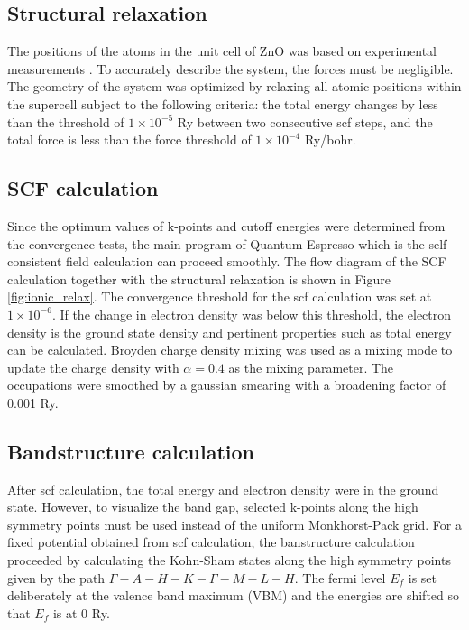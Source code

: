     \subsection{Structural relaxation}
    The positions of the atoms in the unit cell of ZnO was based on experimental measurements \citep{Sabine1969}.  To accurately describe the system, the forces must be negligible. The geometry of the system was optimized by relaxing all atomic positions within the supercell subject to the following criteria: the total energy changes by less than the threshold of $1 \times 10^{-5}$ Ry between two consecutive scf steps, and the total force is less than the force threshold of $1 \times 10^{-4}$ Ry/bohr. 

    \subsection{SCF calculation}
        Since the optimum values of k-points and cutoff energies were determined from the convergence tests, the main program of Quantum Espresso which is the self-consistent field calculation can proceed smoothly. The flow diagram of the SCF calculation together with the structural relaxation is shown in Figure \ref{fig:ionic_relax}. The convergence threshold for the scf calculation was set at $1 \times 10^{-6}$. If the change in electron density was below this threshold, the electron density is the ground state density and pertinent properties such as total energy can be calculated. Broyden charge density mixing was used as a mixing mode to update the charge density with  $\alpha = 0.4$ as the mixing parameter.   The occupations were smoothed by a gaussian smearing with a broadening factor of 0.001 Ry. 

        \subsection{Bandstructure calculation}
        After scf calculation, the total energy and electron density were in the ground state. However, to visualize the band gap, selected k-points along the high symmetry points must be used instead of the uniform Monkhorst-Pack grid. For a fixed potential obtained from scf calculation, the banstructure calculation proceeded by calculating the Kohn-Sham states along the high symmetry points given by the path $\Gamma-A-H-K-\Gamma-M-L-H$. The fermi level $E_f$ is set deliberately at the valence band maximum (VBM) and the energies are shifted so that $E_f$ is at  0 Ry. 

